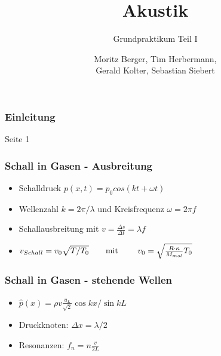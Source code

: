 \documentclass[12pt]{beamer}
\begin{document}
	\author{Moritz Berger, Tim Herbermann,\\ Gerald Kolter, Sebastian Siebert}
	\title{Akustik}
	\subtitle{Grundpraktikum Teil I}
	\frame[plain]{\maketitle}
	
	\begin{frame}
		\frametitle{Einleitung}
		Seite 1
	\end{frame}

	\begin{frame}
		\frametitle{Schall in Gasen - Ausbreitung}
		\begin{itemize}
		\item Schalldruck  $p(x, t) = p_0 cos(kt + \omega t)$
		\item Wellenzahl $k = 2\pi / \lambda$ und Kreisfrequenz $\omega = 2\pi f$
		\item Schallausbreitung mit $v = \frac{\Delta s}{\Delta t} = \lambda f$
		\end{itemize}
		\begin{itemize}
		\item $v_{Schall} = v_0 \sqrt{T/T_0} \text{\qquad mit \qquad} v_0 = \sqrt{\frac{R\cdot\kappa}{M_{mol}}T_0}$
		\end{itemize}
		
	\end{frame}
	
	\begin{frame}
		\frametitle{Schall in Gasen - stehende Wellen}
		\begin{itemize}
		\item $\hat{p}(x) = \rho v \frac{u_L}{\sqrt{2}} \cos kx/\sin kL$
		\item Druckknoten: $\Delta x = \lambda / 2$
		\item Resonanzen: $f_n = n  \frac{v}{2L}$
		\end{itemize}
		
	\end{frame}
	
\end{document}
